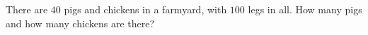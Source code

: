 There are $40$ pigs and chickens in a farmyard, with $100$ legs in all. How many pigs and how many chickens are there?

